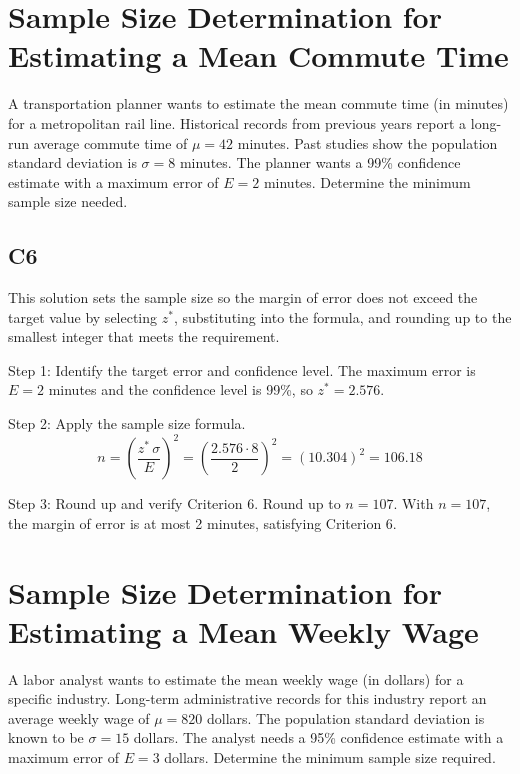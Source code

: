 	\begin{ExamProblems}
		\item
		\section{Sample Size Determination for Estimating a Mean Commute Time}
		A transportation planner wants to estimate the mean commute time (in minutes) for a metropolitan rail line. Historical records from previous years report a long-run average commute time of $\mu = 42$ minutes. Past studies show the population standard deviation is $\sigma = 8$ minutes. The planner wants a 99\% confidence estimate with a maximum error of $E = 2$ minutes. Determine the minimum sample size needed.
		
		\subsection*{C6}
		This solution sets the sample size so the margin of error does not exceed the target value by selecting $z^*$, substituting into the formula, and rounding up to the smallest integer that meets the requirement.
		
		Step 1: Identify the target error and confidence level. The maximum error is $E = 2$ minutes and the confidence level is 99\%, so $z^* = 2.576$.
		
		Step 2: Apply the sample size formula.
		\[
		n = \left(\frac{z^*\,\sigma}{E}\right)^2
		= \left(\frac{2.576 \cdot 8}{2}\right)^2
		= \left(10.304\right)^2
		= 106.18
		\]
		
		Step 3: Round up and verify Criterion 6. Round up to $n = 107$. With $n=107$, the margin of error is at most 2 minutes, satisfying Criterion 6.
		
		\item
		\section{Sample Size Determination for Estimating a Mean Weekly Wage}
		A labor analyst wants to estimate the mean weekly wage (in dollars) for a specific industry. Long-term administrative records for this industry report an average weekly wage of $\mu = 820$ dollars. The population standard deviation is known to be $\sigma = 15$ dollars. The analyst needs a 95\% confidence estimate with a maximum error of $E = 3$ dollars. Determine the minimum sample size required.
		

\end{ExamProblems}
